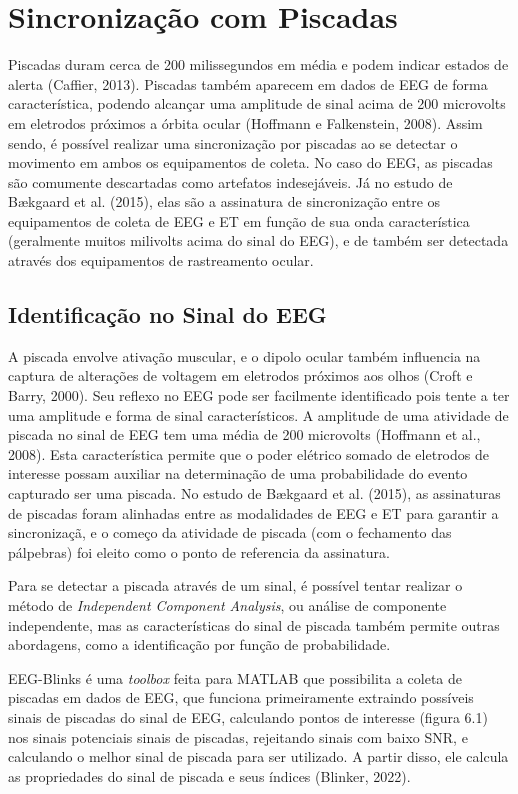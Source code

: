 \section{Sincronização com Piscadas}
Piscadas duram cerca de 200 milissegundos em média e podem indicar estados de alerta (Caffier, 2013). 
Piscadas também aparecem em dados de EEG de forma característica, 
podendo alcançar uma amplitude de sinal acima de 200 microvolts em eletrodos próximos a 
órbita ocular (Hoffmann e Falkenstein, 2008). Assim sendo, é possível realizar uma sincronização 
por piscadas ao se detectar o movimento em ambos os equipamentos de coleta. 
No caso do EEG, as piscadas são comumente descartadas como artefatos indesejáveis. 
Já no estudo de Bækgaard et al. (2015), elas são a assinatura de sincronização 
entre os equipamentos de coleta de EEG e ET em função de sua onda característica
 (geralmente muitos milivolts acima do sinal do EEG), e de também 
ser detectada através dos equipamentos de rastreamento ocular.





\subsection{Identificação no Sinal do EEG}

A piscada envolve ativação muscular, e o dipolo ocular também influencia na captura de alterações de voltagem em eletrodos próximos aos olhos
(Croft e Barry, 2000). Seu reflexo no EEG pode ser facilmente identificado pois tente a ter uma amplitude e forma de sinal característicos. 
A amplitude de uma atividade de piscada no sinal de EEG tem uma média de 200 microvolts (Hoffmann et al., 2008). Esta característica permite
que o poder elétrico somado de eletrodos de interesse possam auxiliar na determinação de uma probabilidade do evento capturado ser uma piscada. 
No estudo de Bækgaard et al. (2015), as assinaturas de piscadas foram alinhadas entre as modalidades de EEG e ET para garantir a sincronizaçã, e
o começo da atividade de piscada (com o fechamento das pálpebras) foi eleito como o ponto de referencia da assinatura. 


Para se detectar a piscada através de um sinal, é possível tentar realizar o método de \textit{Independent Component Analysis}, ou análise de 
componente independente, mas as características do sinal de piscada também permite outras abordagens, como a identificação por função de probabilidade.

EEG-Blinks é uma \textit{toolbox} feita para MATLAB que possibilita a coleta de piscadas em dados de EEG, que 
funciona primeiramente extraindo possíveis sinais de piscadas do sinal de EEG, calculando pontos de interesse (figura 6.1) 
nos sinais potenciais sinais de piscadas, rejeitando sinais com baixo SNR, e calculando o melhor sinal de piscada
para ser utilizado. A partir disso, ele calcula as propriedades do sinal de piscada e seus índices (Blinker, 2022).

